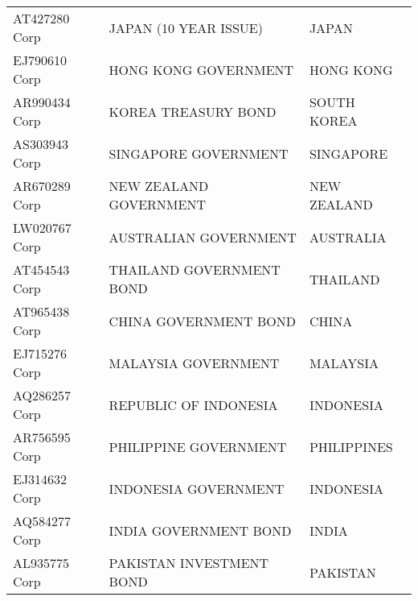 \begin {table}[H]
\begin{center}
\begin{tabu}{| l l l |}
AT427280 Corp & JAPAN (10 YEAR ISSUE) & JAPAN \\
EJ790610 Corp & HONG KONG GOVERNMENT & HONG KONG \\
AR990434 Corp & KOREA TREASURY BOND & SOUTH KOREA \\
AS303943 Corp & SINGAPORE GOVERNMENT & SINGAPORE \\
AR670289 Corp & NEW ZEALAND GOVERNMENT & NEW ZEALAND \\
LW020767 Corp & AUSTRALIAN GOVERNMENT & AUSTRALIA \\
AT454543 Corp & THAILAND GOVERNMENT BOND & THAILAND \\
AT965438 Corp & CHINA GOVERNMENT BOND & CHINA \\
EJ715276 Corp & MALAYSIA GOVERNMENT & MALAYSIA \\
AQ286257 Corp & REPUBLIC OF INDONESIA & INDONESIA \\
AR756595 Corp & PHILIPPINE GOVERNMENT & PHILIPPINES \\
EJ314632 Corp & INDONESIA GOVERNMENT & INDONESIA \\
AQ584277 Corp & INDIA GOVERNMENT BOND & INDIA \\
AL935775 Corp & PAKISTAN INVESTMENT BOND & PAKISTAN \\
\hline
\end{tabu}
\small
\end{center}
\end{table}